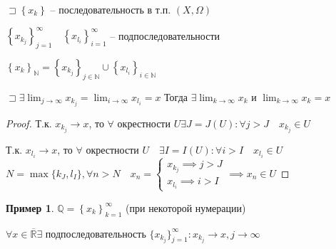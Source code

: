 \documentclass{book}
\newcommand\N{\ensuremath{\mathbb{N}}}
\newcommand\R{\ensuremath{\mathbb{R}}}
\newcommand\Q{\ensuremath{\mathbb{Q}}}
\newcommand{\ov}[1]{\overline{#1}}
\theoremstyle{definition}
\newtheorem*{example}{Пример}
\begin{document}
\begin{statement}
    
$\sqsupset \left\{ x_k \right\} $ -- последовательность в т.п. $(X, \Omega)$

$\left\{ x_{k_j} \right\} _{j=1}^{\infty }\quad \left\{ x_{l_i} \right\} _{i=1}^{\infty }$ -- подпоследовательности

$\left\{ x_k \right\} _{\N } = \left\{ x_{k_j} \right\} _{j\in \N } \cup \left\{ x_{l_i} \right\} _{i\in \N }$

$\sqsupset \exists \lim_{j \to \infty} x_{k_j} = \lim_{i \to \infty} x_{l_i} = x$ Тогда $\exists \lim_{k \to \infty} x_k$ и $\lim_{k \to \infty} x_k = x$
\end{statement}
\begin{proof}
    Т.к. $x_{k_j} \to  x$, то $\forall $ окрестности $U \exists J = J(U): \forall j>J\quad x_{k_j}\in U$

    Т.к. $x_{l_i} \to x$, то $\forall $ окрестности $U\quad \exists I = I(U): \forall i>I\quad x_{l_i}\in U$
    $N = \max\{k_J, l_I\}, \forall n>N\quad x_n = \begin{cases}
        x_{k_{j}} \implies  j>J\\
        x_{l_i} \implies  i>I
    \end{cases} \implies x_n\in U$
\end{proof}

\begin{example}
    $\Q = \left\{ x_k \right\} _{k=1}^{\infty }$ (при некоторой нумерации)

    \begin{problem}
        $\forall x\in \ov {\R} \exists $ подпоследовательность $\{x_{k_j}\}_{j=1}^{\infty }: x_{k_j} \to x, j\to \infty $
    \end{problem}
\end{example}
\end{document}
